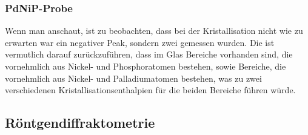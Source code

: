 \documentclass[
	a4paper,
	12pt,
	pagesize,
	ngerman
]{scrartcl}
\begin{document}
	\subsubsection*{PdNiP-Probe}
	Wenn man  anschaut, ist zu beobachten, dass bei der Kristallisation nicht wie zu erwarten war ein negativer Peak, sondern zwei gemessen wurden.
	Die ist vermutlich darauf zurückzuführen, dass im Glas Bereiche vorhanden sind, die vornehmlich aus Nickel- und Phosphoratomen bestehen, sowie Bereiche, die vornehmlich aus Nickel- und Palladiumatomen bestehen, was zu zwei verschiedenen Kristallisationsenthalpien für die beiden Bereiche führen würde.

	\subsection{Röntgendiffraktometrie}
\end{document}
